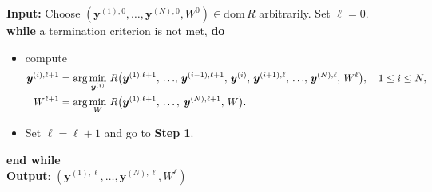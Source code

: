 \documentclass[10pt]{article}
\begin{document}
\begin{algorithm}[h]
\caption{A dual block coordinate descent method for solving \eqref{subcmot3d}}\label{algBCD}
\textbf{Input:} Choose $(\bm{y}^{(1),0},\dots,\bm{y}^{(N),0},W^0)\in\mathrm{dom}\,R$ arbitrarily. Set $\ell=0$.  \\
\textbf{while} a termination criterion is not met, \textbf{do} \vspace{-2mm}
\begin{itemize}[leftmargin=2cm]
\item[\textbf{Step 1}.] compute
\begin{equation*}%
\begin{aligned}
\bm{y}^{(i),\ell+1} &= \arg\min_{\bm{y}^{(i)}}\,R\big{(}\bm{y}^{(1),\ell+1}, \,\dots\!,\, \bm{y}^{(i-1),\ell+1},\,\bm{y}^{(i)}, \,\bm{y}^{(i+1),\ell}, \,\dots\!,\,\bm{y}^{(N),\ell},\, W^\ell\big{)}, \quad 1\leq i\leq N, \\
W^{\ell+1} &= \arg\min_{W}\,R\big{(}\bm{y}^{(1),\ell+1},\,\dots,\;\bm{y}^{(N),\ell+1},\,W\big{)}.
\end{aligned}\vspace{-2mm}
\end{equation*}

\item [\textbf{Step 2}.] Set $\ell=\ell+1$ and go to \textbf{Step 1}. \vspace{-1.5mm}
\end{itemize}
\textbf{end while}  \\
\textbf{Output}: $(\bm{y}^{(1),\ell},\dots,\bm{y}^{(N),\ell},W^{\ell})$ \vspace{0.5mm}
\end{algorithm}
\end{document}
